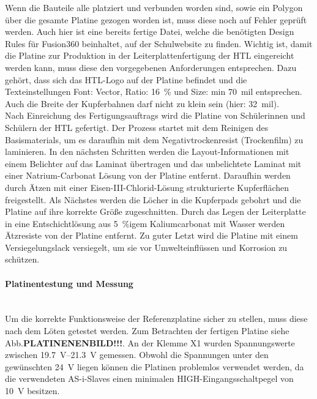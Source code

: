 Wenn die Bauteile alle platziert und verbunden worden sind, sowie ein Polygon über die gesamte Platine gezogen worden ist, muss diese noch auf Fehler geprüft werden. Auch hier ist eine bereits fertige Datei, welche die benötigten Design Rules für Fusion360 beinhaltet, auf der Schulwebsite zu finden. Wichtig ist, damit die Platine zur Produktion in der Leiterplattenfertigung der HTL eingereicht werden kann, muss diese den vorgegebenen Anforderungen entsprechen. Dazu gehört, dass sich das HTL-Logo auf der Platine befindet und die Texteinstellungen Font: Vector, Ratio: \qty{16}{\percent} und Size: min \qty{70}{mil} entsprechen. Auch die Breite der Kupferbahnen darf nicht zu klein sein (hier: \qty{32}{mil}).\\
Nach Einreichung des Fertigungsauftrags wird die Platine von Schülerinnen und Schülern der HTL gefertigt. Der Prozess startet mit dem Reinigen des Basismaterials, um es daraufhin mit dem Negativtrockenresist (Trockenfilm) zu laminieren. In den nächsten Schritten werden die Layout-Informationen mit einem Belichter auf das Laminat übertragen und das unbelichtete Laminat mit einer Natrium-Carbonat Lösung von der Platine entfernt. Daraufhin werden durch Ätzen mit einer Eisen-III-Chlorid-Lösung strukturierte Kupferflächen freigestellt. Als Nächstes werden die Löcher in die Kupferpads gebohrt und die Platine auf ihre korrekte Größe zugeschnitten. Durch das Legen der Leiterplatte in eine Entschichtlösung aus \qty{5}{\percent}{igem} Kaliumcarbonat mit Wasser werden Ätzresiste von der Platine entfernt. Zu guter Letzt wird die Platine mit einem Versiegelungslack versiegelt, um sie vor Umwelteinflüssen und Korrosion zu schützen.

\paragraph{Platinentestung und Messung} \mbox{}\\
Um die korrekte Funktionsweise der Referenzplatine sicher zu stellen, muss diese nach dem Löten getestet werden. Zum Betrachten der fertigen Platine siehe Abb.\textbf{PLATINENENBILD!!!}. An der Klemme X1 wurden Spannungswerte zwischen \qtyrange{19.7}{21.3}{\volt} gemessen. Obwohl die Spannungen unter den gewünschten \qty{24}{\volt} liegen können die Platinen problemlos verwendet werden, da die verwendeten AS-i-Slaves einen minimalen HIGH-Eingangsschaltpegel von \qty{10}{\volt} besitzen.\cite{AS-i-Slave}

